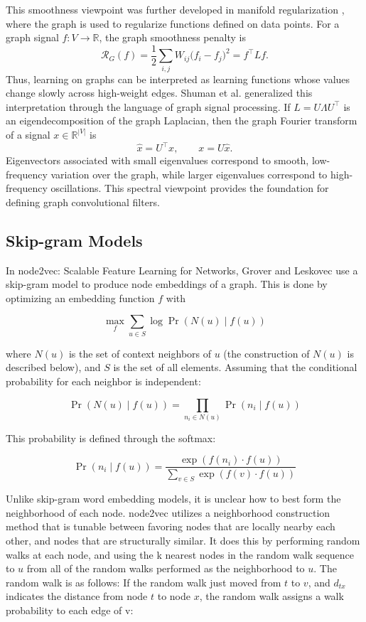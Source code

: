 \documentclass[11pt]{article}
\begin{document}
This smoothness viewpoint was further developed in manifold regularization \cite{belkin2006manifold}, where the graph is used to regularize functions defined on data points. For a graph signal $f : V \to \mathbb{R}$, the graph smoothness penalty is
\[
    \mathcal{R}_{G}(f)
    = \frac{1}{2}\sum_{i,j} W_{ij}\big(f_i - f_j\big)^2
    = f^\top L f.
\]
Thus, learning on graphs can be interpreted as learning functions whose values change slowly across high-weight edges. Shuman et al. \cite{shuman2013emerging} generalized this interpretation through the language of graph signal processing. If $L = U\Lambda U^\top$ is an eigendecomposition of the graph Laplacian, then the graph Fourier transform of a signal $x \in \mathbb{R}^{|V|}$ is
\[
    \widehat{x} = U^\top x,
    \qquad
    x = U\widehat{x}.
\]
Eigenvectors associated with small eigenvalues correspond to smooth, low-frequency variation over the graph, while larger eigenvalues correspond to high-frequency oscillations. This spectral viewpoint provides the foundation for defining graph convolutional filters.

\subsection{Skip-gram Models}

    In node2vec: Scalable Feature Learning for Networks, Grover and Leskovec use a skip-gram model to produce node embeddings of a graph. This is done by optimizing an embedding function $f$ with
    
    \[
    \max_f \sum_{u\in{S}} \log \Pr\left(N(u)\mid f(u)\right)
    \]

    where $N(u)$ is the set of context neighbors of $u$ (the construction of $N(u)$ is described below), and $S$ is the set of all elements. Assuming that the conditional probability for each neighbor is independent:

    \[
    \Pr\left(N(u)\mid f(u)\right)
    =
    \prod_{n_i \in N(u)}
    \Pr\left(n_i \mid f(u)\right)
    \]

    This probability is defined through the softmax:

    \[
    \Pr\left(n_i \mid f(u)\right)
    =
    \frac{
    \exp\left(f(n_i)\cdot f(u)\right)
    }{
    \sum_{v\in{S}} \exp\left(f(v)\cdot f(u)\right)
    }
    \]

Unlike skip-gram word embedding models, it is unclear how to best form the neighborhood of each node. node2vec utilizes a neighborhood construction method that is tunable between favoring nodes that are locally nearby each other, and nodes that are structurally similar. It does this by performing random walks at each node, and using the k nearest nodes in the random walk sequence to $u$ from all of the random walks performed as the neighborhood to $u$. 
The random walk is as follows: If the random walk just moved from $t$ to $v$, and $d_{tx}$ indicates the distance from node $t$ to node $x$, the random walk assigns a walk probability to each edge of v: 
\end{document}
